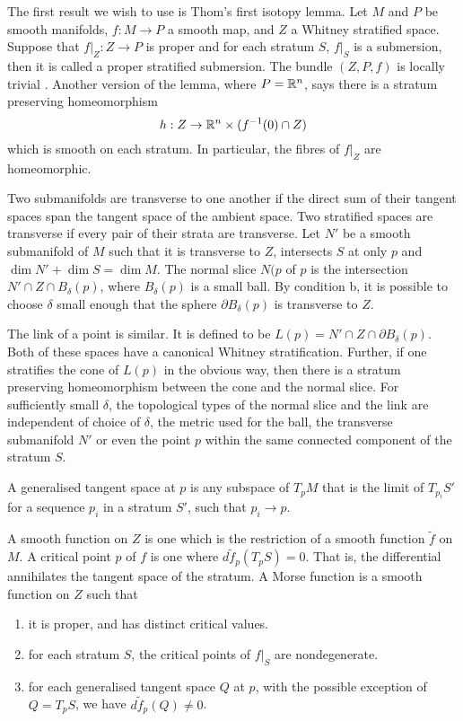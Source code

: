 The first result we wish to use is Thom's first isotopy lemma. Let $M$ and $P$ be smooth manifolds, $f: M \to P$ a smooth map, and $Z$ a Whitney stratified space. Suppose that $f|_Z : Z \to P$ is proper and for each stratum $S$, $f|_S$ is a submersion, then it is called a proper stratified submersion. The bundle $(Z,P,f)$ is locally trivial \cite[Prop 11.1]{Mather1970}. Another version\cite[p41]{Goresky1989} of the lemma, where $P=\mathbb{R}^n$, says there is a stratum preserving homeomorphism
\[
h : Z \to \mathbb{R}^n\times(f^{-1}(0) \cap Z)
\]
which is smooth on each stratum. In particular, the fibres of $f|_Z$ are homeomorphic.

Two submanifolds are transverse to one another if the direct sum of their tangent spaces span the tangent space of the ambient space. Two stratified spaces are transverse if every pair of their strata are transverse.  Let $N'$ be a smooth submanifold of $M$ such that it is transverse to $Z$, intersects $S$ at only $p$ and $\dim N' + \dim S = \dim M$. The normal slice $N(p$ of $p$ is the intersection $ N' \cap Z \cap B_δ(p)$, where $B_δ(p)$ is a small ball. By condition b, it is possible to choose $δ$ small enough that the sphere $\partial B_δ(p)$ is transverse to $Z$.

The link of a point is similar. It is defined to be $L(p) = N' \cap Z \cap \partial B_δ(p)$. Both of these spaces have a canonical Whitney stratification. Further, if one stratifies the cone of $L(p)$ in the obvious way, then there is a stratum preserving homeomorphism between the cone and the normal slice. For sufficiently small $δ$, the topological types of the normal slice and the link are independent of choice of $δ$, the metric used for the ball, the transverse submanifold $N'$ or even the point $p$ within the same connected component of the stratum $S$.

A generalised tangent space at $p$ is any subspace of $T_pM$ that is the limit of $T_{p_i}S'$ for a sequence $p_i$ in a stratum $S'$, such that $p_i \to p$.

A smooth function on $Z$ is one which is the restriction of a smooth function $\tilde f$ on $M$. A critical point $p$ of $f$ is one where $d\tilde f_p (T_p S) = 0$. That is, the differential annihilates the tangent space of the stratum. A Morse function is a smooth function on $Z$ such that
\begin{enumerate}
\item it is proper, and has distinct critical values.
\item for each stratum $S$, the critical points of $f|_S$ are nondegenerate.
\item for each generalised tangent space $Q$ at $p$, with the possible exception of $Q=T_pS$, we have $d\tilde f _p (Q) \neq 0$.
\end{enumerate}

